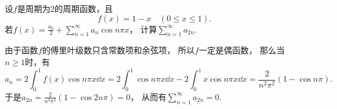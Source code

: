 \begin{example}
设\(f\)是周期为2的周期函数，且\begin{equation*}
	f(x) = 1-x
	\quad(0 \leq x \leq 1).
\end{equation*}
若\(f(x) = \frac{a_0}2 + \sum_{n=1}^\infty a_n \cos n\pi x\)，
计算\(\sum_{n=1}^\infty a_{2n}\).
\begin{solution}
由于函数\(f\)的傅里叶级数只含常数项和余弦项，
所以\(f\)一定是偶函数，
那么当\(n\geq1\)时，有\begin{equation*}
	a_n = 2 \int_0^1 f(x) \cos n\pi x \dd{x}
	= 2 \int_0^1 \cos n\pi x \dd{x}
	- 2 \int_0^1 x \cos n\pi x \dd{x}
	= \frac2{n^2\pi^2} (1 - \cos n\pi).
\end{equation*}
于是\(a_{2n} = \frac2{n^2\pi^2} (1 - \cos 2n\pi) = 0\)，
从而有\(\sum_{n=1}^\infty a_{2n} = 0\).
\end{solution}
\end{example}

